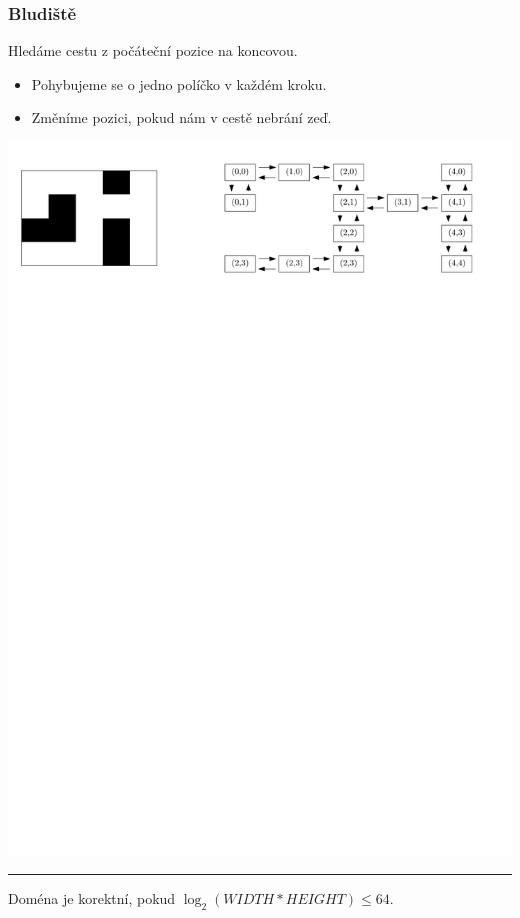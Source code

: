 \documentclass[usenames,dvipsnames,9pt]{beamer}
\begin{document}
\begin{frame}
  \frametitle{Bludiště}
  
  Hledáme cestu z počáteční pozice na koncovou.
  
  \begin{itemize}
  \item Pohybujeme se o jedno políčko v každém kroku.
  \item Změníme pozici, pokud nám v cestě nebrání zeď.
  \end{itemize}
  
  \vspace{1em}

\begin{center}
\includegraphics[width=0.9\linewidth]{08/figs/maze.pdf}
\end{center}

\vspace{1em}\hrule\vspace{1em}

\faWarning\hspace{3pt} Doména je korektní, pokud $\log_2(WIDTH*HEIGHT) \leq 64$.
\end{frame}
\end{document}

